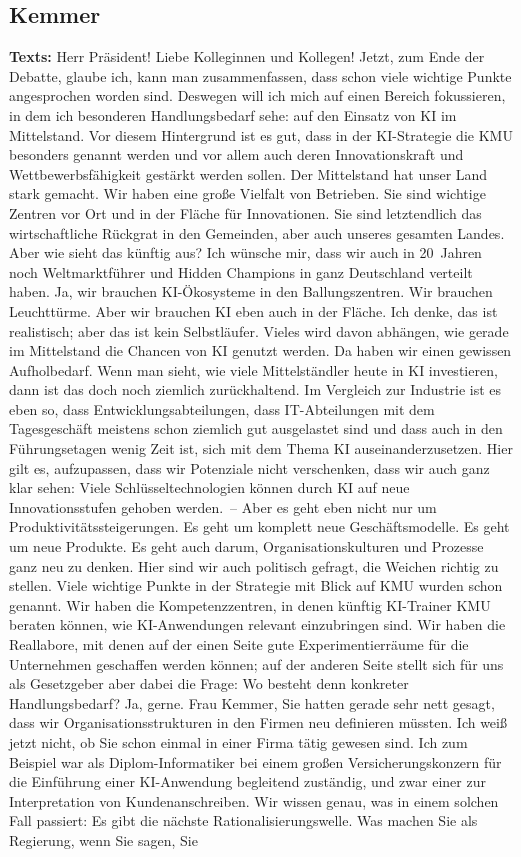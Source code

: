 \documentclass{article}
\begin{document}
\subsection{Kemmer}
\noindent\textbf{Texts:} Herr Präsident! Liebe Kolleginnen und Kollegen! Jetzt, zum Ende der Debatte, glaube ich, kann man zusammenfassen, dass schon viele wichtige Punkte angesprochen worden sind. Deswegen will ich mich auf einen Bereich fokussieren, in dem ich besonderen Handlungsbedarf sehe: auf den Einsatz von KI im Mittelstand. Vor diesem Hintergrund ist es gut, dass in der KI-Strategie die KMU besonders genannt werden und vor allem auch deren Innovationskraft und Wettbewerbsfähigkeit gestärkt werden sollen. Der Mittelstand hat unser Land stark gemacht.  Wir haben eine große Vielfalt von Betrieben. Sie sind wichtige Zentren vor Ort und in der Fläche für Innovationen. Sie sind letztendlich das wirtschaftliche Rückgrat in den Gemeinden, aber auch unseres gesamten Landes.  Aber wie sieht das künftig aus? Ich wünsche mir, dass wir auch in 20 Jahren noch Weltmarktführer und Hidden Champions in ganz Deutschland verteilt haben. Ja, wir brauchen KI-Ökosysteme in den Ballungszentren. Wir brauchen Leuchttürme. Aber wir brauchen KI eben auch in der Fläche. Ich denke, das ist realistisch; aber das ist kein Selbstläufer. Vieles wird davon abhängen, wie gerade im Mittelstand die Chancen von KI genutzt werden. Da haben wir einen gewissen Aufholbedarf. Wenn man sieht, wie viele Mittelständler heute in KI investieren, dann ist das doch noch ziemlich zurückhaltend. Im Vergleich zur Industrie ist es eben so, dass Entwicklungsabteilungen, dass IT-Abteilungen mit dem Tagesgeschäft meistens schon ziemlich gut ausgelastet sind und dass auch in den Führungsetagen wenig Zeit ist, sich mit dem Thema KI auseinanderzusetzen. Hier gilt es, aufzupassen, dass wir Potenziale nicht verschenken, dass wir auch ganz klar sehen: Viele Schlüsseltechnologien können durch KI auf neue Innovationsstufen gehoben werden. – Aber es geht eben nicht nur um Produktivitätssteigerungen. Es geht um komplett neue Geschäftsmodelle. Es geht um neue Produkte. Es geht auch darum, Organisationskulturen und Prozesse ganz neu zu denken.  Hier sind wir auch politisch gefragt, die Weichen richtig zu stellen. Viele wichtige Punkte in der Strategie mit Blick auf KMU wurden schon genannt. Wir haben die Kompetenzzentren, in denen künftig KI-Trainer KMU beraten können, wie KI-Anwendungen relevant einzubringen sind. Wir haben die Reallabore, mit denen auf der einen Seite gute Experimentierräume für die Unternehmen geschaffen werden können; auf der anderen Seite stellt sich für uns als Gesetzgeber aber dabei die Frage: Wo besteht denn konkreter Handlungsbedarf? Ja, gerne.  Frau Kemmer, Sie hatten gerade sehr nett gesagt, dass wir Organisationsstrukturen in den Firmen neu definieren müssten. Ich weiß jetzt nicht, ob Sie schon einmal in einer Firma tätig gewesen sind. Ich zum Beispiel war als Diplom-Informatiker bei einem großen Versicherungskonzern für die Einführung einer KI-Anwendung begleitend zuständig,  und zwar einer zur Interpretation von Kundenanschreiben. Wir wissen genau, was in einem solchen Fall passiert: Es gibt die nächste Rationalisierungswelle. Was machen Sie als Regierung, wenn Sie sagen, Sie 
\end{document}
